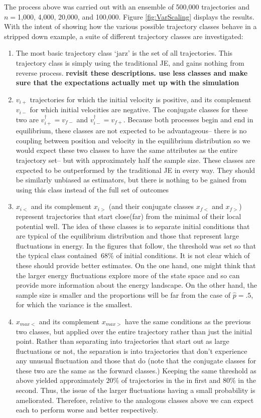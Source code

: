 \documentclass[paper=a4, fontsize=10pt]{article} %
\numberwithin{equation}{section} %
\numberwithin{figure}{section} %
\numberwithin{table}{section} %
\def\tbf #1{\textbf{#1} }
\begin{document}
The process above was carried out with an ensemble of 500,000 trajectories and $n=$1,000, 4,000, 20,000, and 100,000. Figure \ref{fig:VarScaling} displays the results. With the intent of showing how the various possible trajectory classes behave in a stripped down example, a suite of different trajectory classes are investigated:
\begin{enumerate}
\item The most basic trajectory class `jarz' is the set of all trajectories. This trajectory class is simply using the traditional JE, and gains nothing from reverse process. \tbf{revisit these descriptions. use less classes and make sure that the expectations actually met up with the simulation}
\item $v_{i+}$ trajectories for which the initial velocity is positive, and its complement $v_{i-}$ for which initial velocities are negative. The conjugate classes for these two are $v^\dagger_{i+} = v_{f-}$ and $v^{\dagger}_{i-}=v_{f+}$. Because both processes begin and end in equilibrium, these classes are not expected to be advantageous-- there is no coupling between position and velocity in the equilibrium distribution so we would expect these two classes to have the same attributes as the entire trajectory set-- but with approximately half the sample size. These classes are expected to be outperformed by the traditional JE in every way. They should be similarly unbiased as estimators, but there is nothing to be gained from using this class instead of the full set of outcomes
\item $x_{i<}$ and its complement $x_{i>}$ (and their conjugate classes $x_{f<}$ and $x_{f>}$) represent trajectories that start close(far) from the minimal of their local potential well. The idea of these classes is to separate initial conditions that are typical of the equilibrium distribution and those that represent large fluctuations in energy. In the figures that follow, the threshold was set so that the typical class contained $~68\%$ of initial conditions. It is not clear which of these should provide better estimates. On the one hand, one might think that the larger energy fluctuations explore more of the state space and so can provide more information about the energy landscape. On the other hand, the sample size is smaller and the proportions will be far from the case of $\hat{p}=.5$, for which the variance is the smallest.
\item $x_{max<}$ and its complement $x_{max>}$ have the same conditions as the previous two classes, but applied over the entire trajectory rather than just the initial point. Rather than separating into trajectories that start out as large fluctuations or not, the separation is into trajectories that don't experience any unusual fluctuation and those that do (note that the conjugate classes for these two are the same as the forward classes.) Keeping the same threshold as above yielded approximately $20\%$ of trajectories in the in first and $80\%$ in the second. Thus, the issue of the larger fluctuations having a small probability is ameliorated. Therefore, relative to the analogous classes above we can expect each to perform worse and better respectively.

\end{enumerate}
\end{document}
